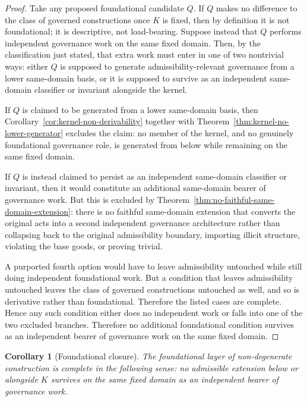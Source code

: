 \documentclass[11pt]{article}
\newtheorem{corollary}[theorem]{Corollary}
\theoremstyle{definition}
\theoremstyle{remark}
\begin{document}
\begin{proof}
Take any proposed foundational candidate $Q$. If $Q$ makes no difference to the class of governed constructions once $K$ is fixed, then by definition it is not foundational; it is descriptive, not load-bearing. Suppose instead that $Q$ performs independent governance work on the same fixed domain. Then, by the classification just stated, that extra work must enter in one of two nontrivial ways: either $Q$ is supposed to generate admissibility-relevant governance from a lower same-domain basis, or it is supposed to survive as an independent same-domain classifier or invariant alongside the kernel.

If $Q$ is claimed to be generated from a lower same-domain basis, then Corollary~\ref{cor:kernel-non-derivability} together with Theorem~\ref{thm:kernel-no-lower-generator} excludes the claim: no member of the kernel, and no genuinely foundational governance role, is generated from below while remaining on the same fixed domain.

If $Q$ is instead claimed to persist as an independent same-domain classifier or invariant, then it would constitute an additional same-domain bearer of governance work. But this is excluded by Theorem~\ref{thm:no-faithful-same-domain-extension}: there is no faithful same-domain extension that converts the original acts into a second independent governance architecture rather than collapsing back to the original admissibility boundary, importing illicit structure, violating the base goods, or proving trivial.

A purported fourth option would have to leave admissibility untouched while still doing independent foundational work. But a condition that leaves admissibility untouched leaves the class of governed constructions untouched as well, and so is derivative rather than foundational. Therefore the listed cases are complete. Hence any such condition either does no independent work or falls into one of the two excluded branches. Therefore no additional foundational condition survives as an independent bearer of governance work on the same fixed domain.
\end{proof}

\begin{corollary}[Foundational closure]
The foundational layer of non-degenerate construction is complete in the following sense: no admissible extension below or alongside $K$ survives on the same fixed domain as an independent bearer of governance work.
\end{corollary}
\end{document}
